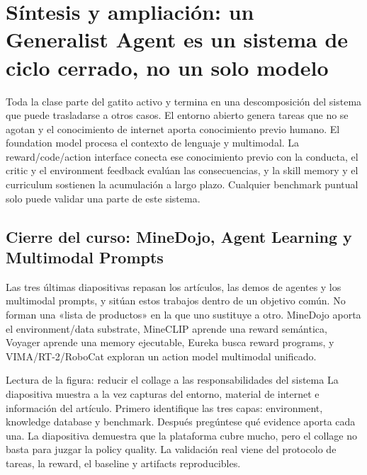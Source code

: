 \section{Síntesis y ampliación: un Generalist Agent es un sistema de ciclo cerrado, no un solo modelo}

Toda la clase parte del gatito activo y termina en una descomposición del sistema que puede trasladarse a otros casos. El entorno abierto genera tareas que no se agotan y el conocimiento de internet aporta conocimiento previo humano. El foundation model procesa el contexto de lenguaje y multimodal. La reward/code/action interface conecta ese conocimiento previo con la conducta, el critic y el environment feedback evalúan las consecuencias, y la skill memory y el curriculum sostienen la acumulación a largo plazo. Cualquier benchmark puntual solo puede validar una parte de este sistema.

\subsection{Cierre del curso: MineDojo, Agent Learning y Multimodal Prompts}

Las tres últimas diapositivas repasan los artículos, las demos de agentes y los multimodal prompts, y sitúan estos trabajos dentro de un objetivo común. No forman una «lista de productos» en la que uno sustituye a otro. MineDojo aporta el environment/data substrate, MineCLIP aprende una reward semántica, Voyager aprende una memory ejecutable, Eureka busca reward programs, y VIMA/RT-2/RoboCat exploran un action model multimodal unificado.


\begin{knowledgebox}{Lectura de la figura: reducir el collage a las responsabilidades del sistema}
La diapositiva muestra a la vez capturas del entorno, material de internet e información del artículo. Primero identifique las tres capas: environment, knowledge database y benchmark. Después pregúntese qué evidence aporta cada una. La diapositiva demuestra que la plataforma cubre mucho, pero el collage no basta para juzgar la policy quality. La validación real viene del protocolo de tareas, la reward, el baseline y artifacts reproducibles.
\end{knowledgebox}

